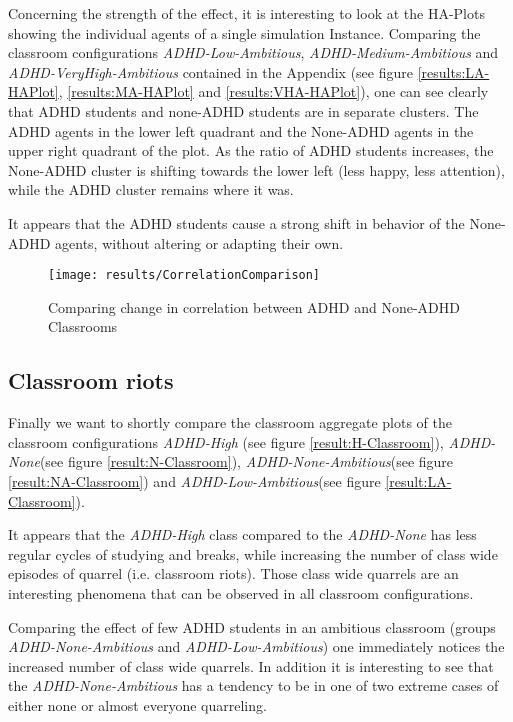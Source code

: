 Concerning the strength of the effect, it is interesting to look at the HA-Plots
showing the individual agents of a single simulation Instance. Comparing the classroom
configurations \textit{ADHD-Low-Ambitious}, \textit{ADHD-Medium-Ambitious} and
\textit{ADHD-VeryHigh-Ambitious} contained in the Appendix (see figure \ref{results:LA-HAPlot}, \ref{results:MA-HAPlot} and \ref{results:VHA-HAPlot}),
one can see clearly that ADHD students and none-ADHD students are in separate clusters.
The ADHD agents in the lower left quadrant and the None-ADHD agents in the upper right quadrant of the plot.
As the ratio of ADHD students increases, the None-ADHD cluster is shifting
towards the lower left (less happy, less attention), while the ADHD cluster remains
where it was.

\bb

It appears that the ADHD students cause a strong shift in behavior of the None-ADHD
agents, without altering or adapting their own.

\begin{figure}[]
    \centering
    \texttt{[image: results/CorrelationComparison]}
    \caption{Comparing change in correlation between ADHD and None-ADHD Classrooms}
    \label{CorrleationComparison}
\end{figure}

\subsection{Classroom riots}
Finally we want to shortly compare the classroom aggregate plots of the classroom
configurations \textit{ADHD-High} (see figure \ref{result:H-Classroom}), \textit{ADHD-None}(see figure \ref{result:N-Classroom}),
\textit{ADHD-None-Ambitious}(see figure \ref{result:NA-Classroom}) and \textit{ADHD-Low-Ambitious}(see figure \ref{result:LA-Classroom}).

\bb

It appears that the \textit{ADHD-High} class compared to the \textit{ADHD-None}
has less regular cycles of studying and breaks, while increasing the number of
class wide episodes of quarrel (i.e. classroom riots). Those class wide quarrels
are an interesting phenomena that can be observed in all classroom configurations. 

\bb

Comparing the effect of few ADHD students in an ambitious classroom (groups
\textit{ADHD-None-Ambitious} and \textit{ADHD-Low-Ambitious}) one immediately
notices the increased number of class wide quarrels. In addition it is interesting
to see that the \textit{ADHD-None-Ambitious} has a tendency to be in one of
two extreme cases of either none or almost everyone quarreling. 

